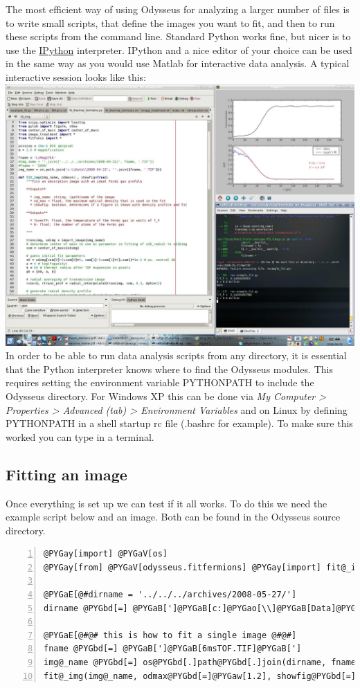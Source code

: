 \documentclass[letterpaper,10pt,english]{manual}
\begin{document}
The most efficient way of using Odysseus for analyzing a larger number of files is to write small scripts, that define the images you want to fit, and then to run these scripts from the command line. Standard Python works fine, but nicer is to use the \href{http://ipython.scipy.org/moin/}{IPython} interpreter. IPython and a nice editor of your choice can be used in the same way as you would use Matlab for interactive data analysis. A typical interactive session looks like this:
\includegraphics[width=500pt]{interactive_python.jpg}
In order to be able to run data analysis scripts from any directory, it is essential that the Python interpreter knows where to find the Odysseus modules. This requires setting the environment variable PYTHONPATH to include the Odysseus directory. For Windows XP this can be done via \emph{My Computer \textgreater{} Properties \textgreater{} Advanced (tab) \textgreater{} Environment Variables} and on Linux by defining PYTHONPATH in a shell startup rc file (.bashrc for example). To make sure this worked you can type  in a terminal.


\subsection{Fitting an image}

Once everything is set up we can test if it all works. To do this we need the example script below and an image. Both can be found in the Odysseus source directory.

\begin{Verbatim}[commandchars=@\[\],numbers=left,firstnumber=1,stepnumber=1]
@PYGay[import] @PYGaV[os]
@PYGay[from] @PYGaV[odysseus.fitfermions] @PYGay[import] fit@_img

@PYGaE[@#dirname = '../../../archives/2008-05-27/']
dirname @PYGbd[=] @PYGaB[']@PYGaB[c:]@PYGao[\\]@PYGaB[Data]@PYGao[\\]@PYGaB[2008-05-27]@PYGaB[']

@PYGaE[@#@# this is how to fit a single image @#@#]
fname @PYGbd[=] @PYGaB[']@PYGaB[6msTOF.TIF]@PYGaB[']
img@_name @PYGbd[=] os@PYGbd[.]path@PYGbd[.]join(dirname, fname)
fit@_img(img@_name, odmax@PYGbd[=]@PYGaw[1.2], showfig@PYGbd[=]@PYGaA[True])
\end{Verbatim}
\end{document}
